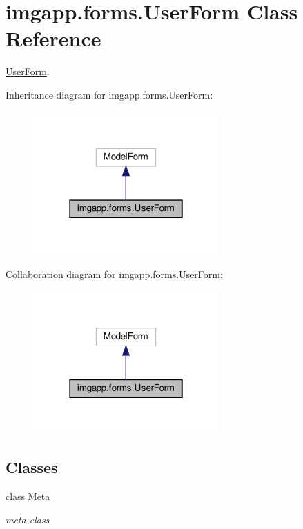 \hypertarget{classimgapp_1_1forms_1_1UserForm}{}\section{imgapp.\+forms.\+User\+Form Class Reference}
\label{classimgapp_1_1forms_1_1UserForm}


\hyperlink{classimgapp_1_1forms_1_1UserForm}{User\+Form}.  




Inheritance diagram for imgapp.\+forms.\+User\+Form\+:\nopagebreak
\begin{figure}[H]
\begin{center}
\leavevmode
\includegraphics[width=202pt]{classimgapp_1_1forms_1_1UserForm__inherit__graph}
\end{center}
\end{figure}


Collaboration diagram for imgapp.\+forms.\+User\+Form\+:\nopagebreak
\begin{figure}[H]
\begin{center}
\leavevmode
\includegraphics[width=202pt]{classimgapp_1_1forms_1_1UserForm__coll__graph}
\end{center}
\end{figure}
\subsection*{Classes}
\begin{DoxyCompactItemize}
\item 
class \hyperlink{classimgapp_1_1forms_1_1UserForm_1_1Meta}{Meta}
\begin{DoxyCompactList}\small\item\em meta class \end{DoxyCompactList}\end{DoxyCompactItemize}


